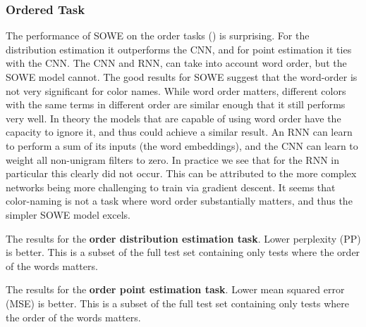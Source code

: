 \documentclass[11pt,a4paper]{article}
\begin{document}
\subsubsection{Ordered Task}
The performance of SOWE on the order tasks () is surprising.
For the distribution estimation it outperforms the CNN, and for point estimation it ties with the CNN.
The CNN and RNN, can take into account word order, but the SOWE model cannot.
The good results for SOWE suggest that the word-order is not very significant for color names.
While word order matters, different colors with the same terms in different order are similar enough that it still performs very well.
In theory the models that are capable of using word order have the capacity to ignore it, and thus could achieve a similar result.
An RNN can learn to perform a sum of its inputs (the word embeddings),
and the CNN can learn to weight all non-unigram filters to zero.
In practice we see that for the RNN in particular this clearly did not occur.
This can be attributed to the more complex networks being more challenging to train via gradient descent.
It seems that color-naming is not a task where word order substantially matters,
and thus the simpler SOWE model excels.




\begin{table}
	\caption{\label{tbl:distord} The results for the \textbf{order distribution estimation task}. Lower perplexity (PP) is better. This is a subset of the full test set containing only tests where the order of the words matters.}
\end{table}


\begin{table}
	\caption{\label{tbl:pointord} The results for the \textbf{order point estimation task}. Lower mean squared error (MSE) is better. This is a subset of the full test set containing only tests where the order of the words matters.}
\end{table}
\end{document}
